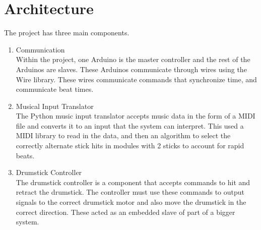 \documentclass[]{article}
\begin{document}
\section{Architecture}
The project has three main components.

	\begin{enumerate}
		\item Communication\\ Within the project, one Arduino is the master controller and the rest of the Arduinos are slaves. These Arduinos communicate through wires using the Wire library. These wires communicate commands that synchronize time, and communicate beat times. 
		
		\item Musical Input Translator\\ The Python music input translator accepts music data in the form of a MIDI file and converts it to an input that the system can interpret. This used a MIDI library to read in the data, and then an algorithm to select the correctly alternate stick hits in modules with 2 sticks to account for rapid beats. 
		
		\item Drumstick	Controller\\
		The	drumstick controller is	a component	that accepts commands to	hit	and	retract	the	drumstick. The controller must use these commands to output signals to the correct drumstick motor and also move the drumstick in the correct direction. These acted as an embedded slave of part of a bigger system. 
	\end{enumerate}
	
	
\end{document}
